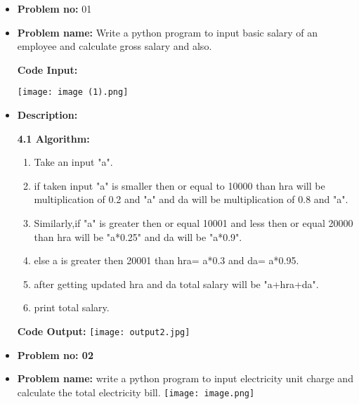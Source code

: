 \documentclass[a4paper]{article}
\begin{document}
\pagebreak
\begin{itemize}
    \item\textbf{Problem no: }01 
\item \textbf{Problem name:} Write a python program to input basic salary of an employee and calculate gross salary and also.

\textbf{Code Input:} 
\begin{center}
\texttt{[image: image (1).png]}
\end{center}
\item \textbf{Description:}

\textbf{4.1 Algorithm:}
\begin{enumerate}
    \item Take an input "a".
    \item if taken input "a" is smaller then or equal to 10000 than hra will be multiplication of 0.2 and "a" and da will be multiplication of 0.8 and "a".
    \item Similarly,if "a" is greater then or equal 10001 and less then or equal 20000 than hra will be "a*0.25" and da will be "a*0.9".
    \item else a is greater then 20001 than hra= a*0.3 and da= a*0.95.
    \item after getting updated hra and da total salary will be "a+hra+da".
    \item print total salary.
\end{enumerate}
\textbf{Code Output:} 
\newline
\texttt{[image: output2.jpg]}
\pagebreak


\item\textbf{Problem no: 02}
\item \textbf{Problem name:} write a python program to input electricity unit charge and calculate the total electricity bill.
\newline
\texttt{[image: image.png]}



\end{itemize}
\end{document}
